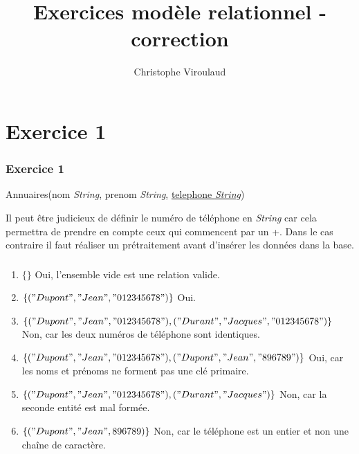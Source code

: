 \documentclass[svgnames,11pt]{beamer}
\author[]{Christophe Viroulaud}
\title{Exercices modèle relationnel - correction}
\date{\framebox{\textbf{BDD 02}}}
\institute{Terminale - NSI}
\begin{document}
\begin{frame}
\titlepage
\end{frame}
\section{Exercice 1}
\begin{frame}
    \frametitle{Exercice 1}

   \begin{center}
        Annuaires(nom \emph{String}, prenom \emph{String}, \underline{telephone \emph{String}}) 
   \end{center}  
    Il peut être judicieux de définir le numéro de téléphone en \emph{String} car cela permettra de prendre en compte ceux qui commencent par un +. Dans le cas contraire il faut réaliser un prétraitement avant d'insérer les données dans la base.

\end{frame}
\begin{frame}
    \frametitle{}

    \begin{enumerate}
        \item $\{\}$ Oui, l'ensemble vide est une relation valide.
        \item $\{("Dupont","Jean","012345678")\}$ Oui.
        \item $\{("Dupont","Jean","012345678"), ("Durant","Jacques","012345678")\}$ Non, car les deux numéros de téléphone sont identiques.
        \item $\{("Dupont","Jean","012345678"), ("Dupont","Jean","896789")\}$ Oui, car les noms et prénoms ne forment pas une clé primaire.
        \item $\{("Dupont","Jean","012345678"), ("Durant","Jacques")\}$ Non, car la seconde entité est mal formée.
        \item $\{("Dupont","Jean",896789)\}$ Non, car le téléphone est un entier et non une chaîne de caractère.
    \end{enumerate}

\end{frame}
\end{document}
